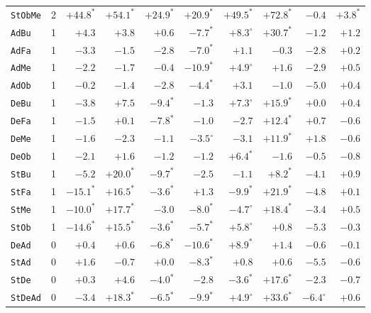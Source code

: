 \begin{table}[H]
{\begin{tabular}{lcrrrrrrrr}
\texttt{StObMe} & 2 & $+44.8^{\ast}$ & $+54.1^{\ast}$ & $+24.9^{\ast}$ & $+20.9^{\ast}$ & $+49.5^{\ast}$ & $+72.8^{\ast}$ & $-0.4$ & $+3.8^{\ast}$\\
\texttt{AdBu} & 1 & $+4.3$ & $+3.8$ & $+0.6$ & $-7.7^{\ast}$ & $+8.3^{\circ}$ & $+30.7^{\ast}$ & $-1.2$ & $+1.2$\\
\texttt{AdFa} & 1 & $-3.3$ & $-1.5$ & $-2.8$ & $-7.0^{\ast}$ & $+1.1$ & $-0.3$ & $-2.8$ & $+0.2$\\
\texttt{AdMe} & 1 & $-2.2$ & $-1.7$ & $-0.4$ & $-10.9^{\ast}$ & $+4.9^{\circ}$ & $+1.6$ & $-2.9$ & $+0.5$\\
\texttt{AdOb} & 1 & $-0.2$ & $-1.4$ & $-2.8$ & $-4.4^{\ast}$ & $+3.1$ & $-1.0$ & $-5.0$ & $+0.4$\\
\texttt{DeBu} & 1 & $-3.8$ & $+7.5$ & $-9.4^{\ast}$ & $-1.3$ & $+7.3^{\circ}$ & $+15.9^{\ast}$ & $+0.0$ & $+0.4$\\
\texttt{DeFa} & 1 & $-1.5$ & $+0.1$ & $-7.8^{\ast}$ & $-1.0$ & $-2.7$ & $+12.4^{\ast}$ & $+0.7$ & $-0.6$\\
\texttt{DeMe} & 1 & $-1.6$ & $-2.3$ & $-1.1$ & $-3.5^{\circ}$ & $-3.1$ & $+11.9^{\ast}$ & $+1.8$ & $-0.6$\\
\texttt{DeOb} & 1 & $-2.1$ & $+1.6$ & $-1.2$ & $-1.2$ & $+6.4^{\ast}$ & $-1.6$ & $-0.5$ & $-0.8$\\
\texttt{StBu} & 1 & $-5.2$ & $+20.0^{\ast}$ & $-9.7^{\ast}$ & $-2.5$ & $-1.1$ & $+8.2^{\ast}$ & $-4.1$ & $+0.9$\\
\texttt{StFa} & 1 & $-15.1^{\ast}$ & $+16.5^{\ast}$ & $-3.6^{\ast}$ & $+1.3$ & $-9.9^{\ast}$ & $+21.9^{\ast}$ & $-4.8$ & $+0.1$\\
\texttt{StMe} & 1 & $-10.0^{\ast}$ & $+17.7^{\ast}$ & $-3.0$ & $-8.0^{\ast}$ & $-4.7^{\circ}$ & $+18.4^{\ast}$ & $-3.4$ & $+0.5$\\
\texttt{StOb} & 1 & $-14.6^{\ast}$ & $+15.5^{\ast}$ & $-3.6^{\ast}$ & $-5.7^{\ast}$ & $+5.8^{\circ}$ & $+0.8$ & $-5.3$ & $-0.3$\\
\texttt{DeAd} & 0 & $+0.4$ & $+0.6$ & $-6.8^{\ast}$ & $-10.6^{\ast}$ & $+8.9^{\ast}$ & $+1.4$ & $-0.6$ & $-0.1$\\
\texttt{StAd} & 0 & $+1.6$ & $-0.7$ & $+0.0$ & $-8.3^{\ast}$ & $+0.8$ & $+0.6$ & $-5.5$ & $-0.6$\\
\texttt{StDe} & 0 & $+0.3$ & $+4.6$ & $-4.0^{\ast}$ & $-2.8$ & $-3.6^{\ast}$ & $+17.6^{\ast}$ & $-2.3$ & $-0.7$\\
\texttt{StDeAd} & 0 & $-3.4$ & $+18.3^{\ast}$ & $-6.5^{\ast}$ & $-9.9^{\ast}$ & $+4.9^{\circ}$ & $+33.6^{\ast}$ & $-6.4^{\circ}$ & $+0.6$\\
\bottomrule
\end{tabular}}
\end{table}
